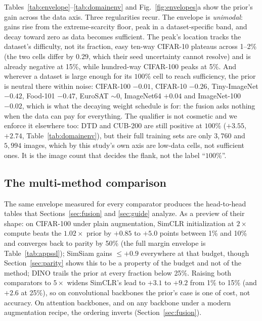 Tables~\ref{tab:envelope}--\ref{tab:domainenv} and
Fig.~\ref{fig:envelopes}a show the prior's gain across the data axis.
Three regularities recur. The envelope is \emph{unimodal}: gains rise
from the extreme-scarcity floor, peak in a dataset-specific band, and
decay toward zero as data becomes sufficient. The peak's location tracks the dataset's difficulty, not its fraction, easy ten-way
CIFAR-10 plateaus across 1--2\% (the two cells differ by $0.29$, which
their seed uncertainty cannot resolve) and is already negative at 15\%,
while
hundred-way CIFAR-100 peaks at 5\%. And wherever a dataset is large enough
for its $100\%$ cell to reach sufficiency, the prior is neutral there within
noise: CIFAR-100 $-0.01$, CIFAR-10 $-0.26$, Tiny-ImageNet $-0.42$,
Food-101 $-0.47$, EuroSAT ${\sim}0$, ImageNet64 $+0.04$ and ImageNet-100
$-0.02$, which is what the decaying weight schedule is for: the fusion
asks nothing when the data can pay for everything. The qualifier is not
cosmetic and we enforce it elsewhere too: DTD and CUB-200 are still
positive at $100\%$ ($+3.55$, $+2.74$, Table~\ref{tab:domainenv}), but
their full training sets are only $3{,}760$ and $5{,}994$ images, which by
this study's own axis are low-data cells, not sufficient ones. It is
the image count that decides the flank, not the label ``$100\%$''.

\subsection{The multi-method comparison}\label{sec:multimethod}
The same envelope measured for every comparator produces the head-to-head
tables that Sections~\ref{sec:fusion} and \ref{sec:guide} analyze. As a
preview of their shape: on CIFAR-100 under plain augmentation, SimCLR
initialization at $2\times$ compute beats the $1.02\times$ prior by
$+0.85$ to $+5.0$ points between 1\% and 10\% and converges back to
parity by 50\% (the full margin envelope is
Table~\ref{tab:appssl}); SimSiam gains ${\leq}+0.9$ everywhere at that budget,
though Section~\ref{sec:parity} shows this to be a property of the budget
and not of the method; DINO trails the prior at every fraction below
25\%. Raising both comparators to $5\times$ widens SimCLR's lead to
$+3.1$ to $+9.2$ from 1\% to 15\% (and $+2.6$ at 25\%), so on convolutional backbones
the prior's case is one of cost, not accuracy. On attention
backbones, and on any backbone under a modern augmentation recipe, the
ordering inverts (Section~\ref{sec:fusion}).

